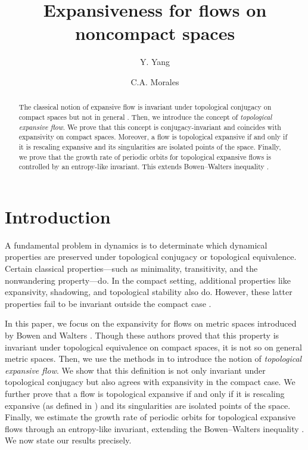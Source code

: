 \documentclass[11pt,letterpaper]{amsart}
\title[Expansiveness for flows on noncompact spaces]{Expansiveness for flows on noncompact spaces}
\author{Y. Yang}
\author{C.A. Morales}
\begin{document}
\begin{abstract} The classical notion of expansive flow \cite{bw} is invariant under topological conjugacy on compact spaces but not in general \cite{lny}. Then, we introduce the concept of {\em topological expansive flow}. We prove that this concept is conjugacy-invariant and coincides with expansivity on compact spaces. Moreover, a flow is topological expansive if and only if it is rescaling expansive \cite{jny} and its singularities are isolated points of the space.
Finally, we prove that the growth rate of periodic orbits for topological expansive flows is controlled by an entropy-like invariant. This extends Bowen–Walters inequality \cite{bw}.
\end{abstract}


\maketitle

\section{Introduction}



\noindent
A fundamental problem in dynamics is to determinate which dynamical properties are preserved under topological conjugacy or topological equivalence.
Certain classical properties—such as minimality, transitivity, and the nonwandering property—do. In the compact setting, additional properties like expansivity, shadowing, and topological stability also do. However, these latter properties fail to be invariant outside the compact case \cite{lny}.

In this paper, we focus on the expansivity for flows on metric spaces
introduced by Bowen and Walters \cite{bw}. Though these authors proved that this property is invariant under topological equivalence on compact spaces, it is not so
on general metric spaces. Then, we use the methods in \cite{lny} to introduce the notion of {\em topological expansive flow}. We show that this definition is not only invariant under topological conjugacy but also agrees with expansivity in the compact case. We further prove that a flow is topological expansive if and only if it is rescaling expansive (as defined in \cite{jny}) and its singularities are isolated points of the space.
Finally, we estimate the growth rate of periodic orbits for topological expansive flows through an entropy-like invariant, extending the Bowen–Walters inequality \cite{bw}.
We now state our results precisely.
\end{document}
